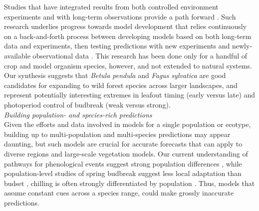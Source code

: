 \documentclass[11pt,letter]{article}
\newcommand{\R}[1]{\label{#1}\linelabel{#1}}
\begin{document}
Studies that have integrated results from both controlled environment experiments and with long-term observations provide a path forward \citep{Caffarra:2011qf,satake2013,chuinearees}. Such research underlies progress towards model development that relies continuously on a back-and-forth process between developing models based on both long-term data and experiments, then testing predictions with new experiments and newly-available observational data \citep{satake2013}. This research has been done only for a handful of crop and model organism species, however, and not extended to natural systems. Our synthesis suggests that \emph{Betula pendula} and \emph{Fagus sylvatica} are good candidates for expanding to wild forest species across larger landscapes, and represent potentially interesting extremes in leafout timing (early versus late) and photoperiod control of budbreak (weak versus strong).\\ %

\emph{Building population- and species-rich predictions} \\
\R{r2popstart}Given the efforts and data involved in models for a single population or ecotype, building up to multi-population and multi-species predictions may appear daunting, but such models are crucial for accurate forecasts that can apply to diverse regions and large-scale vegetation models. Our current understanding of pathways for phenological events suggest strong population differences \citep{Wilczek:2009oa,Tanino2010}, while population-level studies of spring budbreak suggest less local adaptation than budset \citep{Aitken:2008}, chilling is often strongly differentiated by population \citep{Junttila:2012aa}. Thus, models that assume constant cues across a species range, could make grossly inaccurate predictions. \\
\end{document}
